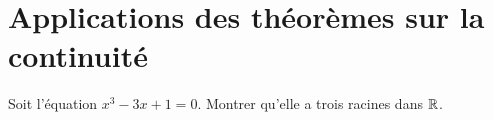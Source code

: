 \documentclass[a4paper, 11pt,reqno]{article}
\begin{document}
% 
\vspace*{1cm}

\noindent\section{\large{Applications des th\'eor\`emes sur la continuit\'e}}

\begin{exercice}  \;
	Soit l'\'equation $x^3-3x+1=0$. Montrer qu'elle a trois racines dans $\mathbb{R}$.
\end{exercice}
\end{document}
